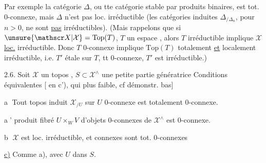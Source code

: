 Par exemple la catégorie $\Delta$, ou tte  catégorie stable par produits binaires, est tot. $0$-connexe, mais $\Delta$ n'est pas loc.  irréductible (les catégories induites $\Delta_{/\Delta_n}$, pour $n>0$, ne sont  \uline{pas} irréductibles). (Mais rappelons que  si $\unsure{\mathscr X|\mathcal X}=\mathrm{Top}(T)$, $T$ un espace , alors $T$ irréductible implique $\mathscr X$ \uline{loc.} irréductible. Donc $T$  $0$-connexe implique $\mathrm{Top}(T)$ totalement \uline{et} localement irréductible, i.e.  $T'$ étale sur $T$, tt $0$-connexe, $T'$ est irréductible.)

 2.6. Soit $\mathscr X$ un topos , $S\subset\mathscr X^{\wedge}$ une petite partie génératrice   Conditions équivalentes [ en c'), qui   plus faible, cf démonstr. bas]


\textcircled{a} Tout topos induit $\mathscr X_{/U}$  sur $U$ $0$-connexe  est totalement  $0$-connexe.

\textcircled{a'}  produit fibré $U\times_W V$ d'objets $0$-connexes de $\mathscr X^{\wedge}$ est $0$-connexe.

\textcircled{b} $\mathscr X$ est loc. irréductible, et   connexes sont tot. $0$-connexes

\uline{c)} Comme a), avec $U$ dans $S$. 




